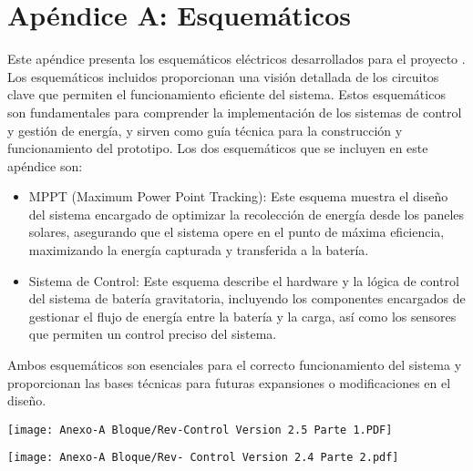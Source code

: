 \chapter{Apéndice A: Esquemáticos}
    Este apéndice presenta los esquemáticos eléctricos desarrollados para el proyecto . Los esquemáticos incluidos proporcionan una visión detallada de los circuitos clave que permiten el funcionamiento eficiente del sistema. Estos esquemáticos son fundamentales para comprender la implementación de los sistemas de control y gestión de energía, y sirven como guía técnica para la construcción y funcionamiento del prototipo.
    Los dos esquemáticos que se incluyen en este apéndice son:\par
    
    \begin{itemize} [label = -]
    \setlength{\itemindent}{2em}
        \item MPPT (Maximum Power Point Tracking): Este esquema muestra el diseño del sistema encargado de optimizar la recolección de energía desde los paneles solares, asegurando que el sistema opere en el punto de máxima eficiencia, maximizando la energía capturada y transferida a la batería.\par
        \item Sistema de Control: Este esquema describe el hardware y la lógica de control del sistema de batería gravitatoria, incluyendo los componentes encargados de gestionar el flujo de energía entre la batería y la carga, así como los sensores que permiten un control preciso del sistema.\par
    \end{itemize}
    
    Ambos esquemáticos son esenciales para el correcto funcionamiento del sistema y proporcionan las bases técnicas para futuras expansiones o modificaciones en el diseño.\par

    \begin{landscape}
        \begin{sidewaysfigure}
            \centering
            \texttt{[image: Anexo-A Bloque/Rev-Control Version 2.5 Parte 1.PDF]}
            \label{fig:A_1}
        \end{sidewaysfigure}
        
        \newpage
        
        \begin{sidewaysfigure}
            \centering
            \texttt{[image: Anexo-A Bloque/Rev- Control Version 2.4 Parte 2.pdf]}
            \label{fig:A_2}
        \end{sidewaysfigure}
        
    \end{landscape}